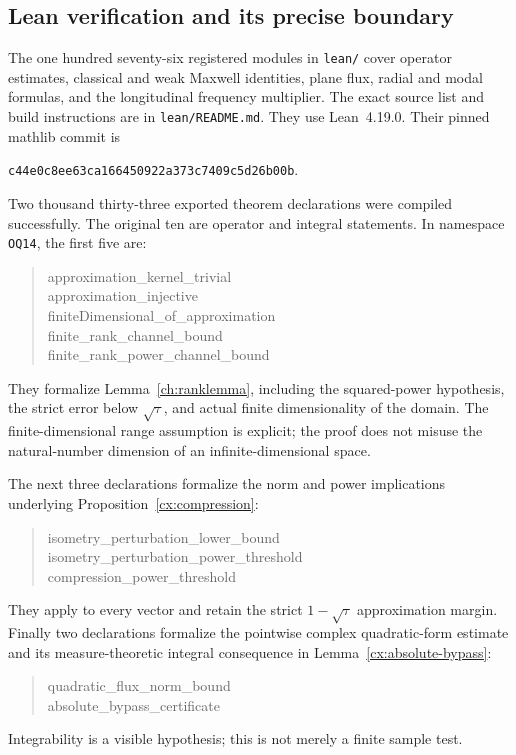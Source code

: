 \subsection{Lean verification and its precise boundary}
\label{ver:lean}
The one hundred seventy-six registered modules in \texttt{lean/} cover operator estimates,
classical and weak Maxwell identities, plane flux, radial and modal
formulas, and the longitudinal frequency multiplier. The exact source
list and build instructions are in \texttt{lean/README.md}.
They use Lean~4.19.0. Their pinned
mathlib commit is
\begin{center}\small\texttt{c44e0c8ee63ca166450922a373c7409c5d26b00b}.\end{center}
Two thousand thirty-three exported theorem declarations were compiled successfully.
The original ten are operator and integral statements. In namespace
\texttt{OQ14}, the first five are:
\begin{quote}\small\ttfamily
approximation\_kernel\_trivial\\
approximation\_injective\\
finiteDimensional\_of\_approximation\\
finite\_rank\_channel\_bound\\
finite\_rank\_power\_channel\_bound
\end{quote}
They formalize Lemma~\ref{ch:ranklemma}, including the squared-power
hypothesis, the strict error below $\sqrt\tau$, and actual finite
dimensionality of the domain. The finite-dimensional range assumption is
explicit; the proof does not misuse the natural-number dimension of an
infinite-dimensional space.

The next three declarations formalize the norm and power
implications underlying Proposition~\ref{cx:compression}:
\begin{quote}\small\ttfamily
isometry\_perturbation\_lower\_bound\\
isometry\_perturbation\_power\_threshold\\
compression\_power\_threshold
\end{quote}
They apply to
every vector and retain the strict $1-\sqrt\tau$ approximation margin.
Finally two declarations formalize the pointwise
complex quadratic-form estimate and its measure-theoretic integral
consequence in Lemma~\ref{cx:absolute-bypass}:
\begin{quote}\small\ttfamily
quadratic\_flux\_norm\_bound\\
absolute\_bypass\_certificate
\end{quote}
Integrability is a
visible hypothesis; this is not merely a finite sample test.

